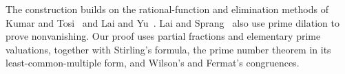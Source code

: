 The construction builds on the rational-function and elimination methods
of Kumar and Tosi~\cite{KT26} and Lai and Yu~\cite{LY20}.
Lai and Sprang~\cite{LS25} also use prime dilation to prove nonvanishing.
Our proof uses partial fractions and elementary prime valuations,
together with Stirling's formula, the prime number theorem in its
least-common-multiple form, and Wilson's and Fermat's congruences.
